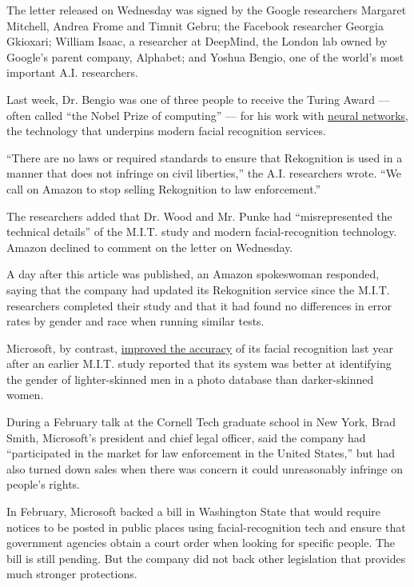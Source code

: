 The letter released on Wednesday was signed by the Google researchers
Margaret Mitchell, Andrea Frome and Timnit Gebru; the Facebook
researcher Georgia Gkioxari; William Isaac, a researcher at DeepMind,
the London lab owned by Google's parent company, Alphabet; and Yoshua
Bengio, one of the world's most important A.I. researchers.

Last week, Dr. Bengio was one of three people to receive the Turing
Award --- often called ``the Nobel Prize of computing'' --- for his work
with
\href{https://www.nytimes3xbfgragh.onion/2018/03/06/technology/google-artificial-intelligence.html}{neural
networks}, the technology that underpins modern facial recognition
services.

``There are no laws or required standards to ensure that Rekognition is
used in a manner that does not infringe on civil liberties,'' the A.I.
researchers wrote. ``We call on Amazon to stop selling Rekognition to
law enforcement.''

The researchers added that Dr. Wood and Mr. Punke had ``misrepresented
the technical details'' of the M.I.T. study and modern
facial-recognition technology. Amazon declined to comment on the letter
on Wednesday.

A day after this article was published, an Amazon spokeswoman responded,
saying that the company had updated its Rekognition service since the
M.I.T. researchers completed their study and that it had found no
differences in error rates by gender and race when running similar
tests.

Microsoft, by contrast,
\href{https://blogs.microsoft.com/ai/gender-skin-tone-facial-recognition-improvement/}{improved
the accuracy} of its facial recognition last year after an earlier
M.I.T. study reported that its system was better at identifying the
gender of lighter-skinned men in a photo database than darker-skinned
women.

During a February talk at the Cornell Tech graduate school in New York,
Brad Smith, Microsoft's president and chief legal officer, said the
company had ``participated in the market for law enforcement in the
United States,'' but had also turned down sales when there was concern
it could unreasonably infringe on people's rights.

In February, Microsoft backed a bill in Washington State that would
require notices to be posted in public places using facial-recognition
tech and ensure that government agencies obtain a court order when
looking for specific people. The bill is still pending. But the company
did not back other legislation that provides much stronger protections.

